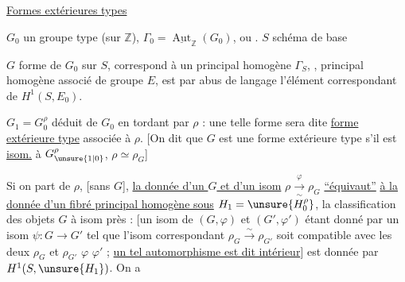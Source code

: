 \uline{Formes extérieures types}


$G_0$ un groupe  type (sur $\mathbb Z$), $\Gamma_0=\underline{\operatorname{Aut}}_{\mathbb Z}(G_0)$,  ou .
$S$ schéma de base

$G$ forme de $G_0$ sur $S$, correspond à un principal homogène  $\Gamma_S$, 
, principal homogène associé de groupe $E$,  est  par abus de langage l'élément correspondant de $H^1(S,E_0)$.

$G_1=G_0^\rho$ déduit de $G_0$ en tordant par $\rho$  : une telle  forme sera dite \uline{forme extérieure type} associée à $\rho$.
[On dit que $G$ est une forme extérieure type s'il est \uline{isom.} à $G_{\unsure{1|0}}^\rho$,   $\rho\simeq\rho_G$]

Si on part de $\rho$, [sans $G$], \uline{la donnée d'un $G$ et d'un isom} $\rho\xrightarrow[\sim]{\varphi}\rho_G$ \uline{``équivaut''} \uline{à la donnée d'un fibré principal homogène sous} $H_1=\unsure{H_0^\rho}$, la classification des objets $G$ à isom près :
[un isom de $(G,\varphi)$ et $(G',\varphi')$ étant donné par un isom $\psi:G\longrightarrow G'$ tel que l'isom correspondant $\rho_G\xrightarrow{\sim}\rho_{G'}$ soit compatible avec les deux $\rho_G$ et $\rho_{G'}$  $\varphi$ $\varphi'$ ; \uline{un tel automorphisme est dit intérieur}]   est donnée par $H^1(S,\unsure{H_1})$. On a


